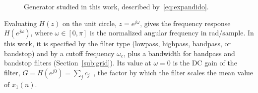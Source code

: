 \documentclass[journal]{IEEEtran}
\begin{document}
\begin{figure}[!t]
\centering
{}
\caption{Generator studied in this work, described by~\eqref{eq:expandido}.}
\label{fig:generator}
\end{figure}

Evaluating $H(z)$ on the unit circle, $z=e^{j\omega}$, gives the frequency
response $H(e^{j\omega})$, where $\omega\in[0,\pi]$ is the normalized angular
frequency in rad/sample. In this work, it is specified by the filter
type (lowpass, highpass, bandpass, or bandstop) and by a cutoff frequency
$\omega_c$, plus a bandwidth for bandpass and bandstop filters
(Section~\ref{sub:grid}). Its value at $\omega=0$ is the DC gain of the filter,
$G=H(e^{j0})=\sum_{j}c_j$~\cite{Oppenheim2009}, the factor by which the filter scales the mean
value of $x_1(n)$.
\end{document}
